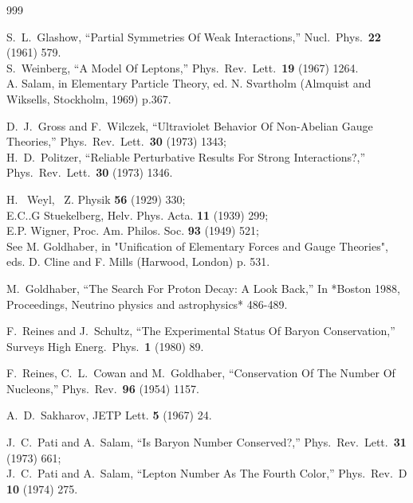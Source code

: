 \begin{thebibliography}{999}

  S.~L.~Glashow,
  ``Partial Symmetries Of Weak Interactions,''
  Nucl.\ Phys.\  {\bf 22} (1961) 579.
\\
  S.~Weinberg,
  ``A Model Of Leptons,''
  Phys.\ Rev.\ Lett.\  {\bf 19} (1967) 1264.
\\
A. Salam, in Elementary Particle Theory, ed. N. Svartholm
(Almquist and Wiksells, Stockholm, 1969) p.367.

  D.~J.~Gross and F.~Wilczek,
  ``Ultraviolet Behavior Of Non-Abelian Gauge Theories,''
  Phys.\ Rev.\ Lett.\  {\bf 30} (1973) 1343;
\\
 H.~D.~Politzer,
  ``Reliable Perturbative Results For Strong Interactions?,''
  Phys.\ Rev.\ Lett.\  {\bf 30} (1973) 1346.

H. ~Weyl,  ~Z. Physik {\bf 56} (1929) 330;
\\
E.C..G Stuekelberg, Helv. Phys. Acta. {\bf 11} (1939) 299;
\\
E.P. Wigner, Proc. Am. Philos. Soc. {\bf 93} (1949)  521;
\\
See M. Goldhaber, in "Unification of Elementary Forces and Gauge Theories",  eds.
D. Cline and F. Mills (Harwood, London) p. 531.

  M.~Goldhaber,
  ``The Search For Proton Decay: A Look Back,''
In *Boston 1988, Proceedings, Neutrino physics and astrophysics* 486-489.

  F.~Reines and J.~Schultz,
  ``The Experimental Status Of Baryon Conservation,''
  Surveys High Energ.\ Phys.\  {\bf 1} (1980) 89.

  F.~Reines, C.~L.~Cowan and M.~Goldhaber,
  ``Conservation Of The Number Of Nucleons,''
  Phys.\ Rev.\  {\bf 96} (1954) 1157.

  A.~D.~Sakharov,
 JETP Lett. {\bf 5} (1967) 24.  

  J.~C.~Pati and A.~Salam,
  ``Is Baryon Number Conserved?,''
  Phys.\ Rev.\ Lett.\  {\bf 31} (1973) 661;
\\
 J.~C.~Pati and A.~Salam,
  ``Lepton Number As The Fourth Color,''
  Phys.\ Rev.\ D {\bf 10} (1974) 275.


\end{thebibliography}
